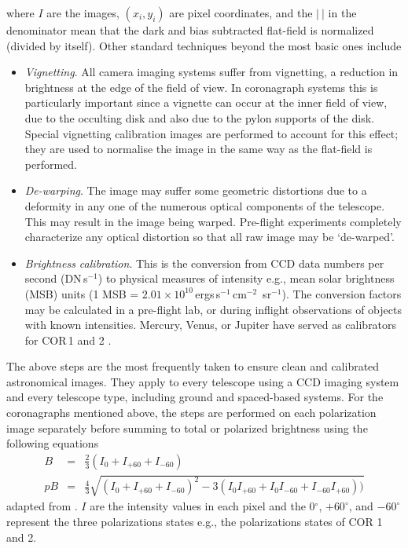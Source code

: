 where $I$ are the images, $(x_i, y_i)$ are pixel coordinates, and the $|~|$ in the denominator mean that the dark and bias subtracted flat-field is normalized (divided by itself). Other standard techniques beyond the most basic ones include
\begin{itemize}
%
%
\item \emph{Vignetting}. All camera imaging systems suffer from vignetting, a reduction in brightness at the edge of the field of view. In coronagraph systems this is particularly important since a vignette can occur at the inner field of view, due to the occulting disk and also due to the pylon supports of the disk. Special vignetting calibration images are performed to account for this effect; they are used to normalise the image in the same way as the flat-field is performed.
%
%
\item \emph{De-warping}. The image may suffer some geometric distortions due to a deformity in any one of the numerous optical components of the telescope. This may result in the image being warped. Pre-flight experiments completely characterize any optical distortion so that all raw image may be `de-warped'.
%
%
\item \emph{Brightness calibration}. This is the conversion from CCD data numbers per second (DN\,s$^{-1}$) to physical measures of intensity e.g., mean solar brightness (MSB) units (1 MSB = $2.01\times10^{10}$\,ergs\,s$^{-1}$\,cm$^{-2}$\, sr$^{-1}$). The conversion factors may be calculated in a pre-flight lab, or during inflight observations of objects with known intensities. Mercury, Venus, or Jupiter have served as calibrators for COR\,1 and 2 \citep{thomp2008}.
\end{itemize}
The above steps are the most frequently taken to ensure clean and calibrated astronomical images. They apply to every telescope using a CCD imaging system and every telescope type, including ground and spaced-based systems. For the coronagraphs mentioned above, the steps are performed on each polarization image separately before summing to total or polarized brightness using the following equations
\begin{eqnarray}
B &=& \frac{2}{3}(I_0 + I_{+60} + I_{-60}) \\
pB &=& \frac{4}{3}\sqrt{(I_0 + I_{+60} + I_{-60})^2 - 3(I_0I_{+60} + I_0I_{-60} + I_{-60}I_{+60}) )}
\end{eqnarray}
adapted from \citet{billings1966}. $I$ are the intensity values in each pixel and the 0$^{\circ}$, $+60^{\circ}$, and $-60^{\circ}$ represent the three polarizations states e.g., the polarizations states of COR 1 and 2.

